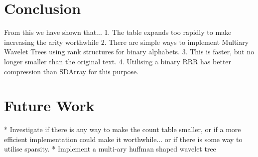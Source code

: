 \section{Conclusion}
From this we have shown that...
 1. The table expands too rapidly to make increasing the arity worthwhile
 2. There are simple ways to implement Multiary Wavelet Trees using rank
	structures for binary alphabets.
 3. This is faster, but no longer smaller than the original text.
 4. Utilising a binary RRR has better compression than SDArray for this purpose.


\section{Future Work}
 * Investigate if there is any way to make the count table smaller, or if a more
   efficient implementation could make it worthwhile... or if there is some way
   to utilise sparsity.
 * Implement a multi-ary huffman shaped wavelet tree